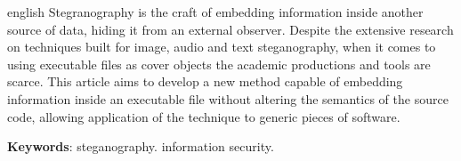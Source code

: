 \begin{resumo}[Abstract]
	\SingleSpacing
	\begin{otherlanguage*}{english}
        Stegranography is the craft of embedding information inside another source of data, hiding it from an external observer. Despite the extensive research on techniques built for image, audio and text steganography, when it comes to using executable files as cover objects the academic productions and tools are scarce. This article aims to develop a new method capable of embedding information inside an executable file without altering the semantics of the source code, allowing application of the technique to generic pieces of software.
		
		\textbf{Keywords}: steganography. information security.
	\end{otherlanguage*}
\end{resumo}

{%
	\hypersetup{hidelinks}
	\listoffigures*
	\cleardoublepage
	
	
	
	\imprimirlistadesiglas
	
	
	\tableofcontents*
	\cleardoublepage
	
}%
